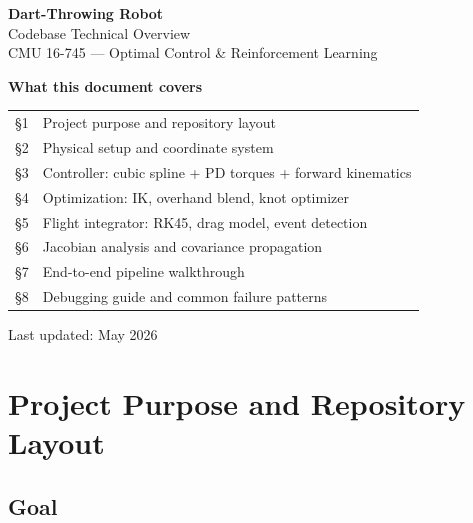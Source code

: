 \documentclass[11pt,letterpaper]{article}
\begin{document}

\begin{titlepage}
  \centering
  \vspace*{2cm}
  {\Huge\bfseries\color{cmu-red} Dart-Throwing Robot\\[0.4em]}
  {\Large Codebase Technical Overview\\[0.3em]}
  {\large CMU 16-745 — Optimal Control \& Reinforcement Learning\\[2cm]}

  \begin{infobox}
    \centering
    \textbf{What this document covers}\\[0.4em]
    \begin{tabular}{ll}
      \S1 & Project purpose and repository layout \\
      \S2 & Physical setup and coordinate system \\
      \S3 & Controller: cubic spline + PD torques + forward kinematics \\
      \S4 & Optimization: IK, overhand blend, knot optimizer \\
      \S5 & Flight integrator: RK45, drag model, event detection \\
      \S6 & Jacobian analysis and covariance propagation \\
      \S7 & End-to-end pipeline walkthrough \\
      \S8 & Debugging guide and common failure patterns \\
    \end{tabular}
  \end{infobox}

  \vfill
  {\small Last updated: May 2026}
\end{titlepage}

\tableofcontents
\newpage

\section{Project Purpose and Repository Layout}

\subsection{Goal}
\end{document}
